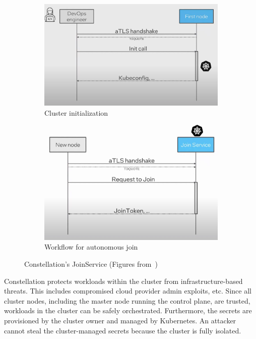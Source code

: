 \begin{figure}[htp]
    \centering
    \begin{subfigure}[b]{0.45\textwidth}
        \centering
        \includegraphics[width=\textwidth]{images/constellation_join_1.png}
        \caption{Cluster initialization}
        \label{fig:constellation_join_1}
    \end{subfigure}
    \hfill
    \begin{subfigure}[b]{0.45\textwidth}
        \centering
        \includegraphics[width=\textwidth]{images/constellation_join_2.png}
        \caption{Workflow for autonomous join}
        \label{fig:constellation_join_2}
    \end{subfigure}
    \hfill
       \caption[Constellation's JoinService]{Constellation's JoinService (Figures from~\cite*{Constellation_Always_encrypted})}
       \label{fig:constellation_join}
\end{figure}

Constellation protects workloads within the cluster from infrastructure-based threats. This includes compromised cloud provider admin exploits, etc. Since all cluster nodes, including the master node running the control plane, are trusted, workloads in the cluster can be safely orchestrated. 
Furthermore, the secrets are provisioned by the cluster owner and managed by Kubernetes. An attacker cannot steal the cluster-managed secrets because the cluster is fully isolated.
 
